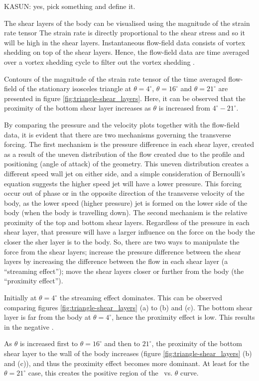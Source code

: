 
KASUN: yes, pick something and define it.

The shear layers of the body can be visualised using the magnitude of the strain rate tensor The strain rate is directly proportional to the shear stress and so it will be high in the shear layers. Instantaneous flow-field data consists of vortex shedding on top of the shear layers. Hence, the flow-field data are time averaged over a vortex shedding cycle to filter out the vortex shedding . 

Contours of the magnitude of the strain rate tensor of the time averaged flow-field of the stationary isosceles triangle at  $\theta=4^{\circ}$, $\theta=16^{\circ}$ and $\theta=21^{\circ}$ are presented in figure \ref{fig:triangle-shear_layers}. Here, it can be observed that the proximity of the bottom shear layer increases as $\theta$ is increased from $4^{\circ}-21^{\circ}$. 


By comparing the pressure and the velocity plots together with the flow-field data, it is evident that there are two mechanisms governing the transverse forcing. The first mechanism is the pressure difference in each shear layer, created as a result of the uneven distribution of the flow created due to the profile and  positioning (angle of attack) of the geometry. This uneven distribution creates a different speed wall jet on either side, and a simple consideration of Bernoulli's equation suggests the higher speed jet will have a lower pressure. This forcing occur out of phase or in the opposite direction of the transverse velocity of the body, as the lower speed (higher pressure) jet is formed on the lower side of the body (when the body is travelling down). The second mechanism is the relative proximity of the top and bottom shear layers. Regardless of the pressure in each shear layer, that pressure will have a larger influence on the force on the body the closer the sher layer is to the body. So, there are two ways to manipulate the force from the shear layers; increase the pressure difference between the shear layers by increasing the difference between the flow in each shear layer (a ``streaming effect''); move the shear layers closer or further from the body (the ``proximity effect'').

Initially at $\theta= 4^{\circ}$ the streaming effect dominates. This can be observed comparing figures \ref{fig:triangle-shear_layers} (a) to (b) and (c). The  bottom shear layer is far from the body at $\theta= 4^{\circ}$, hence the proximity effect is low. This results in the negative \cy.   

As $\theta$ is increased first to $\theta=16^{\circ}$ and then to $21^{\circ}$, the proximity of the bottom shear layer to the wall of the body increases (figure \ref{fig:triangle-shear_layers} (b) and (c)), and thus the proximity effect becomes more dominant. At least for the $\theta = 21^{\circ}$ case, this creates the positive region of the \cy\ vs. $\theta$ curve.